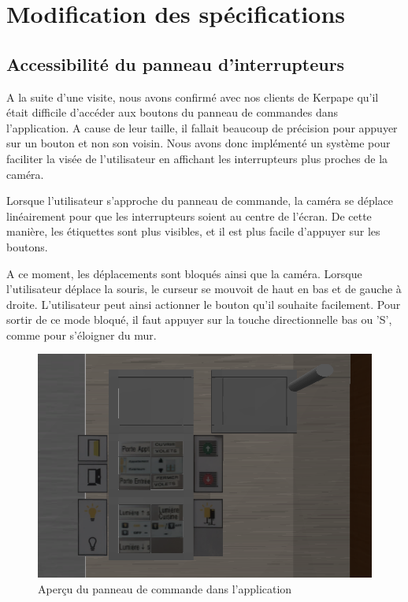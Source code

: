 \section{Modification des spécifications}
\subsection{Accessibilité du panneau d'interrupteurs}
A la suite d'une visite, nous avons confirmé avec nos clients de Kerpape qu'il était difficile d'accéder aux boutons du panneau de commandes dans l'application. A cause de leur taille, il fallait beaucoup de précision pour appuyer sur un bouton et non son voisin. Nous avons donc implémenté un système pour faciliter la visée de l'utilisateur en affichant les interrupteurs plus proches de la caméra.\newline

Lorsque l'utilisateur s'approche du panneau de commande, la caméra se déplace linéairement pour que les interrupteurs soient au centre de l'écran. De cette manière, les étiquettes sont plus visibles, et il est plus facile d'appuyer sur les boutons.\newline

A ce moment, les déplacements sont bloqués ainsi que la caméra. Lorsque l'utilisateur déplace la souris, le curseur se mouvoit de haut en bas et de gauche à droite. L'utilisateur peut ainsi actionner le bouton qu'il souhaite facilement. Pour sortir de ce mode bloqué, il faut appuyer sur la touche directionnelle bas ou 'S', comme pour s'éloigner du mur.

\begin{figure}[h]
	\centering
		\includegraphics[width=\textwidth]{7-RapportFinal/img/screenshot_panneau_commande.png}
		\caption{Aperçu du panneau de commande dans l'application}
	\label{fig:panneau_commande}
\end{figure}
